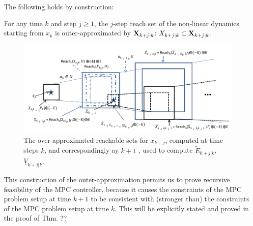 The following holds by construction:
\begin{lemma}
	\label{lemma:xreach}
	For any time $k$ and step $j \geq 1$, the $j$-step reach set of the non-linear dynamics starting from $x_k$ is outer-approximated by $\mathbf{X}_{k+j|k}$:
	$X_{k+j|k} \subset \mathbf{X}_{k+j|k}$.
\end{lemma}


\begin{figure}
\includegraphics[scale=0.75]{figs/OverReachFigure_NL_scissored.pdf}
\caption{The over-approximated reachable sets for $x_{k+j}$, computed at time steps $k$, and correspondingly ay $k+1$ , used to compute $\tilde{E}_{k+j|k}$, $\underline{V}_{k+j|k}$. }
\label{fig:overreach_NL}
\end{figure}

This construction of the outer-approximation permits us to prove recursive feasibility of the MPC controller,  because it causes the constraints of the MPC problem setup at time $k+1$ to be consistent with (stronger than) the constraints of the MPC problem setup at time $k$.
This will be explicitly stated and proved in the proof of Thm. ??